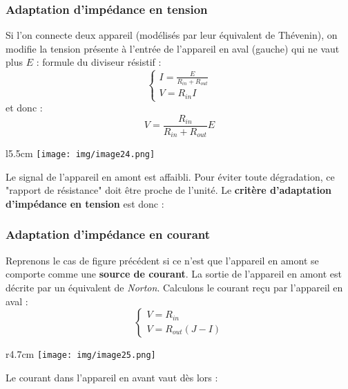 \subsubsection{Adaptation d'impédance en tension}
Si l'on connecte deux appareil (modélisés par leur équivalent de Thévenin), on modifie la tension présente à l'entrée de l'appareil en aval (gauche) qui ne vaut plus $E$ : formule du diviseur résistif :
\begin{equation}
	\left\{\begin{array}{l}
	I = \frac{E}{R_{in} + R_{out}}\\
	V = R_{in} I
	\end{array}\right.
\end{equation}
et donc : 
\begin{equation}
	V = \frac{R_{in}}{R_{in} + R_{out}}E
\end{equation}
\begin{wrapfigure}[5]{l}{5.5cm}
	\texttt{[image: img/image24.png]}
\end{wrapfigure}
Le signal de l'appareil en amont est affaibli. Pour éviter toute dégradation, ce "rapport de résistance" doit être proche de l'unité. Le \textbf{critère d'adaptation d'impédance en tension} est donc :\\


\subsubsection{Adaptation d'impédance en courant}
Reprenons le cas de figure précédent si ce n'est que l'appareil en amont se comporte comme une \textbf{source de courant}. La sortie de l'appareil en amont est décrite par un équivalent de \textit{Norton}. Calculons le courant reçu  par l'appareil en aval :
\begin{equation}
	\left\{\begin{array}{l}
	V = R_{in}\\
	V = R_{out}(J-I)
	\end{array}\right.
\end{equation}
\begin{wrapfigure}[6]{r}{4.7cm}
	\texttt{[image: img/image25.png]}
\end{wrapfigure}
Le courant dans l'appareil en avant vaut dès lors :

